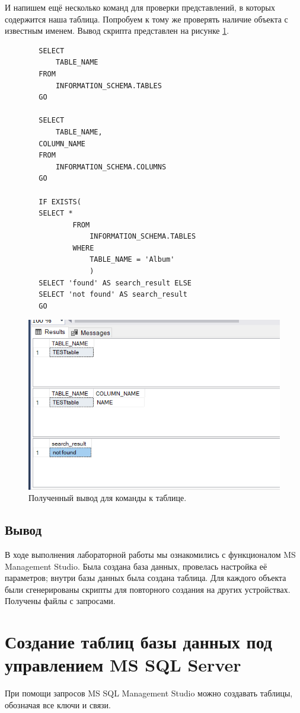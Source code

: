 И напишем ещё несколько команд для проверки представлений, в которых содержится наша таблица. Попробуем к тому же проверять наличие объекта с известным именем. Вывод скрипта представлен на рисунке \ref{fig:ANSTABLESCRIPT}.

\begin{verbatim}
        SELECT
          	TABLE_NAME
        FROM
          	INFORMATION_SCHEMA.TABLES
        GO
        
        SELECT
          	TABLE_NAME,
        COLUMN_NAME
        FROM
          	INFORMATION_SCHEMA.COLUMNS
        GO
        
        IF EXISTS(
        SELECT *
          		FROM
          			INFORMATION_SCHEMA.TABLES
          		WHERE
          			TABLE_NAME = 'Album'
        			)
        SELECT 'found' AS search_result ELSE 
        SELECT 'not found' AS search_result
        GO
\end{verbatim}
\begin{figure}[h!]
    \centering
    \includegraphics[width=0.5\linewidth]{Pic/lab1/ANS.PNG}
    \caption{Полученный вывод для команды к таблице.}
    \label{fig:ANSTABLESCRIPT}
\end{figure}
\subsection{Вывод}

В ходе выполнения лабораторной работы мы ознакомились с функционалом MS Management Studio. Была создана база данных, провелась настройка её параметров; внутри базы данных была создана таблица. Для каждого объекта были сгенерированы скрипты для повторного создания на других устройствах. Получены файлы с запросами.

\newpage
\section{Создание таблиц базы данных под управлением MS SQL Server}

При помощи запросов MS SQL Management Studio можно создавать таблицы, обозначая все ключи и связи. \label{LAB2}

